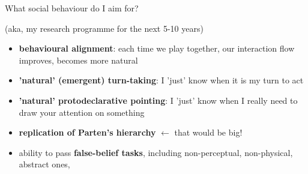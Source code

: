 \documentclass[compress]{beamer}
\begin{document}
\begin{frame}{What social behaviour do I aim for?}

    (aka, my research programme for the next 5-10 years)

    \begin{itemize}

        \item {\bf behavioural alignment}: each time we play together, our
            interaction flow improves, becomes more natural


        \item {\bf 'natural' (\ie emergent) turn-taking}: I 'just' know when it is my
            turn to act

        \item {\bf 'natural' protodeclarative pointing}: I 'just' know when I really
            need to draw your attention on something

        \item {\bf replication of Parten's hierarchy} $\leftarrow$ that would be
            big!

        \item ability to pass {\bf false-belief tasks}, including
            non-perceptual, non-physical, abstract ones,

    \end{itemize}

\end{frame}
\end{document}
